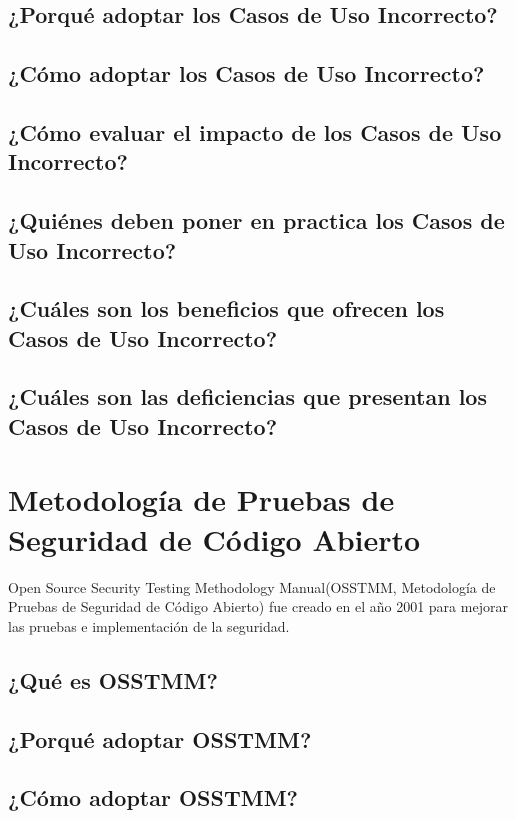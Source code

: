 \documentclass[runningheads,a4paper]{llncs}
\begin{document}
\subsection{¿Porqué adoptar los Casos de Uso Incorrecto?}

\subsection{¿Cómo adoptar los Casos de Uso Incorrecto?}

\subsection{¿Cómo evaluar el impacto de los Casos de Uso Incorrecto?}

\subsection{¿Quiénes deben poner en practica los Casos de Uso Incorrecto?}

\subsection{¿Cuáles son los beneficios que ofrecen los Casos de Uso Incorrecto?}

\subsection{¿Cuáles son las deficiencias que presentan los Casos de Uso Incorrecto?}


\section{Metodología de Pruebas de Seguridad de Código Abierto}
Open Source Security Testing Methodology Manual(OSSTMM, Metodología de Pruebas de Seguridad de Código Abierto) fue creado en el año 2001 para mejorar las pruebas e implementación de la seguridad.

\subsection{¿Qué es \gls{OSSTMM}?}

\subsection{¿Porqué adoptar \gls{OSSTMM}?}

\subsection{¿Cómo adoptar \gls{OSSTMM}?}
\end{document}
